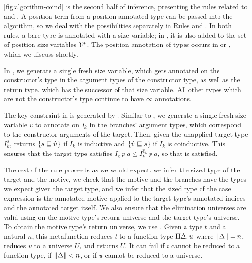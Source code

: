 

\autoref{fig:algorithm-coind} is the second half of inference,
presenting the rules related to \coinductives and \cofixpoints.
A position term from a position-annotated \cofixpoint type can be passed into the algorithm, so we deal with the possibilities separately in Rules  and .
In both rules, a bare \coinductive type is annotated with a size variable; in , it is also added to the set of position size variables $\mathcal{V}^*$.
The position annotation of \coinductive types occurs in  or , which we discuss shortly.

In , we generate a single fresh size variable, which gets annotated on the constructor's \coinductive type in the argument types of the constructor type, as well as the return type, which has the successor of that size variable.
All other \coinductive types which are not the constructor's \coinductive type continue to have $\infty$ annotations.

The key constraint in  is generated by \casesize.
Similar to , we generate a single fresh size variable $\upsilon$ to annotate on $I_k$ in the branches' argument types, which correspond to the constructor arguments of the target.
Then, given the unapplied target type $I_k^s$, \casesize returns $\{s \sqsubseteq \hat{\upsilon}\}$ if $I_k$ is inductive and $\{\hat{\upsilon} \sqsubseteq s\}$ if $I_k$ is coinductive.
This ensures that the target type satisfies $I_k^s ~ \overline{p} ~ \overline{a} \leq I_k^{\hat{\upsilon}_k} ~ \overline{p} ~ \overline{a}$, so that  is satisfied.

The rest of the rule proceeds as we would expect: we infer the sized type of the target and the motive, we check that the motive and the branches have the types we expect given the target type, and we infer that the sized type of the case expression is the annotated motive applied to the target type's annotated indices and the annotated target itself.
We also ensure that the elimination universes are valid using \elim on the motive type's return universe and the target type's universe.
To obtain the motive type's return universe, we use \decompose.
Given a type $t$ and a natural $n$, this metafunction reduces $t$ to a function type $\Pi \Delta \mathpunct{.} u$ where $\lVert\Delta\rVert = n$, reduces $u$ to a universe $U$, and returns $U$.
It can fail if $t$ cannot be reduced to a function type, if $\lVert\Delta\rVert < n$, or if $u$ cannot be reduced to a universe.

